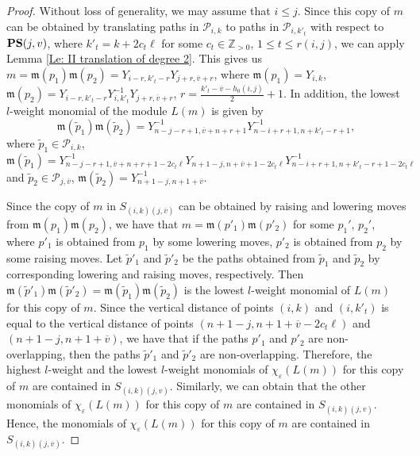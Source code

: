 \documentclass[12pt, reqno]{amsart}
\numberwithin{equation}{section}
\newcommand{\ZZ}{\mathbb{Z}}
\begin{document}
{\begin{proof}
Without loss of generality, we may assume that $i\leq j$. Since this copy of $m$ can be obtained by translating paths in $\mathscr{P}_{i,k}$ to paths in $\mathscr{P}_{i,k'_t}$ with respect to ${\bf PS}(j,v)$, where $k'_t=k+2c_t \ell$ for some $c_t\in \ZZ_{>0}$, $1\leq t\leq r(i,j)$, we can apply Lemma \ref{Le: II translation of degree 2}. This gives us $m=\mathfrak{m}(p_1)\mathfrak{m}(p_2)=Y_{i-r,k'_t-r}Y_{j+r,\overline{v}+r}$, where $\mathfrak{m}(p_1)=Y_{i,k}$, $\mathfrak{m}(p_2)=Y_{i-r,k'_t-r}Y_{i,k'_t}^{-1}Y_{j+r,\overline{v}+r}$, $r=\frac{k'_t-\overline{v}-h_0(i,j)}2+1$. In addition, the lowest $l$-weight monomial of the module $L(m)$ is given by
\[
\mathfrak{m}(\widetilde{p}_1)\mathfrak{m}(\widetilde{p}_2)=Y_{n-j-r+1,\overline{v}+n+r+1}^{-1}Y_{n-i+r+1,n+k'_t-r+1}^{-1},
\]
where $\widetilde{p}_1\in \mathscr{P}_{i,k}$, $\mathfrak{m}(\widetilde{p}_1)=Y_{n-j-r+1,\overline{v}+n+r+1-2c_t \ell}^{-1}Y_{n+1-j,n+\overline{v}+1-2c_t \ell}Y_{n-i+r+1,n+k'_t-r+1-2c_t \ell}^{-1}$ and $\widetilde{p}_2\in \mathscr{P}_{j,\overline{v}}$, $\mathfrak{m}(\widetilde{p}_2)=Y_{n+1-j,n+1+\overline{v}}^{-1}$.

Since the copy of $m$ in $S_{(i, k)(j, \overline{v})}$ can be obtained by raising and lowering moves from $\mathfrak{m}(p_1)\mathfrak{m}(p_2)$, we have that $m=\mathfrak{m}(p'_1)\mathfrak{m}(p'_2)$ for some $p_1'$, $p_2'$, where $p'_1$ is obtained from $p_1$ by some lowering moves, $p'_2$ is obtained from $p_2$ by some raising moves. Let $\widetilde{p}'_1$ and $\widetilde{p}'_2$ be the paths obtained from $\widetilde{p}_1$ and $\widetilde{p}_2$ by corresponding lowering and raising moves, respectively. Then $\mathfrak{m}(\widetilde{p}'_1)\mathfrak{m}(\widetilde{p}'_2)=\mathfrak{m}(\widetilde{p}_1)\mathfrak{m}(\widetilde{p}_2)$ is the lowest $l$-weight monomial of $L(m)$ for this copy of $m$. Since the vertical distance of points $(i,k)$ and $(i,k'_t)$ is equal to the vertical distance of points $(n+1-j,n+1+\overline{v}-2c_t \ell)$ and $(n+1-j,n+1+\overline{v})$, we have that if the paths $p'_1$ and $p'_2$ are non-overlapping, then the paths $\widetilde{p}'_1$ and $\widetilde{p}'_2$ are non-overlapping. 
Therefore, the highest $l$-weight and the lowest $l$-weight monomials of $\chi_{\varepsilon}(L(m))$ for this copy of $m$ are contained in $S_{(i,k)(j,v)}$. Similarly, we can obtain that the other monomials of $\chi_{\varepsilon}(L(m))$ for this copy of $m$ are contained in $S_{(i,k)(j,v)}$. Hence, the monomials of $\chi_{\varepsilon}(L(m))$ for this copy of $m$ are contained in $S_{(i, k)(j, \overline{v})}$.
\end{proof}


}
\end{document}
